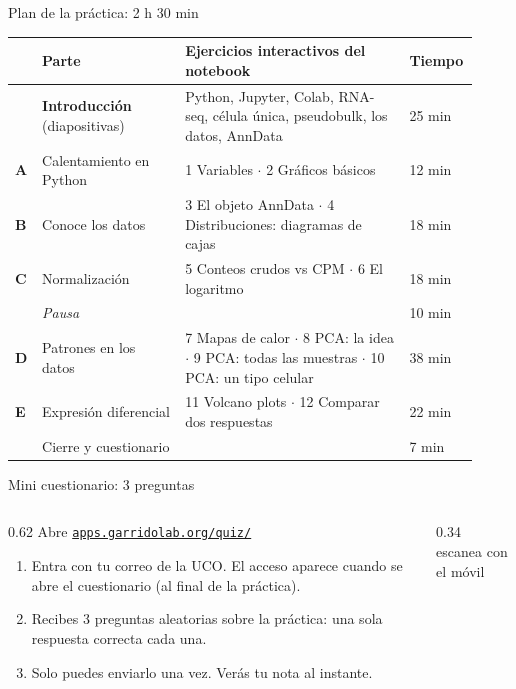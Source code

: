 \documentclass[aspectratio=169,10pt]{beamer}
\begin{document}
\begin{frame}{Plan de la práctica: 2 h 30 min}
  \vspace{0.35cm}
  \scriptsize
  \begin{tabular}{@{}p{0.05\linewidth}p{0.30\linewidth}p{0.47\linewidth}p{0.10\linewidth}@{}}
    \toprule
    & \textbf{Parte} & \textbf{Ejercicios interactivos del notebook} & \textbf{Tiempo}\\\midrule
    & \textbf{Introducción} (diapositivas) & Python, Jupyter, Colab, RNA-seq, célula única, pseudobulk, los datos, AnnData & 25 min\\[1pt]
    \textbf{A} & Calentamiento en Python & 1 Variables $\cdot$ 2 Gráficos básicos & 12 min\\[1pt]
    \textbf{B} & Conoce los datos & 3 El objeto AnnData $\cdot$ 4 Distribuciones: diagramas de cajas & 18 min\\[1pt]
    \textbf{C} & Normalización & 5 Conteos crudos vs CPM $\cdot$ 6 El logaritmo & 18 min\\[1pt]
    & \textit{Pausa} & & 10 min\\[1pt]
    \textbf{D} & Patrones en los datos & 7 Mapas de calor $\cdot$ 8 PCA: la idea $\cdot$ 9 PCA: todas las muestras $\cdot$ 10 PCA: un tipo celular & 38 min\\[1pt]
    \textbf{E} & Expresión diferencial & 11 Volcano plots $\cdot$ 12 Comparar dos respuestas & 22 min\\[1pt]
    & Cierre y cuestionario & & 7 min\\
    \bottomrule
  \end{tabular}
\end{frame}



\begin{frame}{Mini cuestionario: 3 preguntas}
  \begin{columns}[T]
    \begin{column}{0.62\textwidth}
      \large Abre \href{https://apps.garridolab.org/quiz/}{\alert{\texttt{apps.garridolab.org/quiz/}}}
      \normalsize\vspace{0.3cm}

      \begin{enumerate}\setlength\itemsep{6pt}
        \item Entra con tu \alert{correo de la UCO}. El acceso aparece cuando se abre el cuestionario (al final de la práctica).
        \item Recibes \alert{3 preguntas aleatorias} sobre la práctica: una sola respuesta correcta cada una.
        \item Solo puedes enviarlo \alert{una vez}. Verás tu nota al instante.
      \end{enumerate}
    \end{column}
    \begin{column}{0.34\textwidth}
      \centering
      \\[4pt]
      \scriptsize escanea con el móvil
    \end{column}
  \end{columns}
\end{frame}
\end{document}
